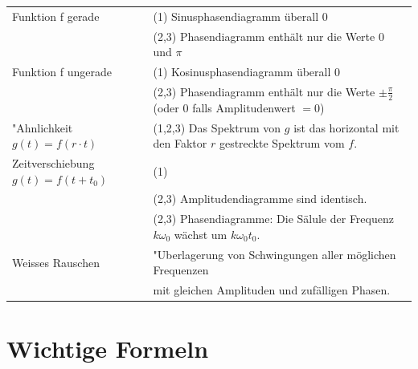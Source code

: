 \begin{tabular}{ll}
	Funktion f gerade 
	& (1) Sinusphasendiagramm überall 0 \\
	& (2,3) Phasendiagramm enthält nur die Werte $0$ und $\pi$ \\
	Funktion f ungerade
	& (1) Kosinusphasendiagramm überall 0 \\
	& (2,3) Phasendiagramm enthält nur die Werte $\pm \frac{\pi}{2}$ (oder $0$ falls Amplitudenwert $=0$) \\
	"Ahnlichkeit $g(t) = f(r \cdot t) $
	& (1,2,3) Das Spektrum von $g$ ist das horizontal mit den Faktor $r$ gestreckte Spektrum vom $f$. \\
	Zeitverschiebung $g(t) = f(t + t_0) $
	& (1) \verweis{Fourier_Zeitverschiebung}{Zeitverschiebung} \\
	& (2,3) Amplitudendiagramme sind identisch. \\
	& (2,3) Phasendiagramme: Die Sälule der Frequenz $k \omega_0$ wächst um $k\omega_0 t_0$. \\
	Weisses Rauschen
	& "Uberlagerung von Schwingungen aller möglichen Frequenzen \\
	& mit gleichen Amplituden und zufälligen Phasen. 
\end{tabular}
\vspace{-\baselineskip}

\label{LastPage}
\section{Wichtige Formeln}	

